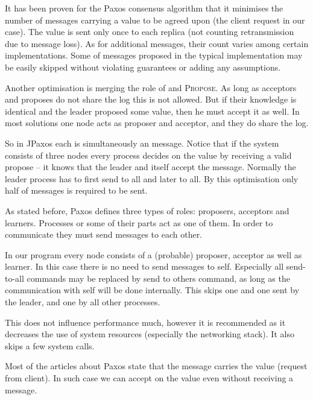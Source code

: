 It has been proven for the Paxos consensus algorithm that it minimises the number of messages carrying a value to be agreed upon (the client request in our case). The value is sent only once to each replica (not counting retransmission due to message loss). As for additional messages, their count varies among certain implementations. Some of messages proposed in the typical implementation may be easily skipped without violating guarantees or adding any assumptions.


Another optimisation is merging the role of \accept and \textsc{Propose}. As long as acceptors and proposes do not share the log this is not allowed. But if their knowledge is identical and the leader proposed some value, then he must accept it as well. In most solutions one node acts as proposer and acceptor, and they do share the log.

So in JPaxos each \propose is simultaneously an \accept message. Notice that if the system consists of three nodes every process decides on the value by receiving a valid propose -- it knows that the leader and itself
accept the message. Normally the leader process has to first send \propose to all and later \accept to all. By this optimisation only half of messages is required to be sent.


As stated before, Paxos defines three types of roles: proposers, acceptors and learners. Processes or some of their parts act as one of them. In order to communicate they must send messages to each other.

In our program every node consists of a (probable) proposer, acceptor as well as learner. In this case there is no need to send messages to self. Especially all send-to-all commands may be replaced by send to others command, as long as the communication with self will be done internally. This skips one \accept and one \propose sent by the leader, and one \accept by all other processes.

This does not influence performance much, however it is recommended as it decreases the use of system resources (especially the networking stack). It also skips a few system calls.


Most of the articles about Paxos state that the \accept message carries the value (request from client).
In such case we can accept on the value even without receiving a \propose message.

